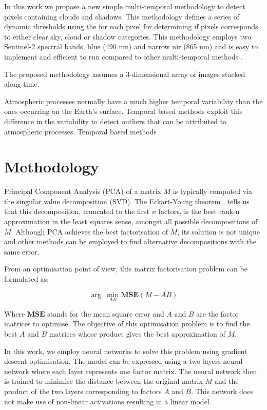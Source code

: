 \documentclass[essd, manuscript]{copernicus}
\begin{document}
In this work we propose a new simple multi-temporal methodology to detect pixels containing clouds and shadows. This methodology defines a series of dynamic thresholds using the for each pixel for determining if pixels corresponds to either clear sky, cloud or shadow categories. This methodology employs two Sentinel-2 spectral bands, blue (490 nm) and narrow nir (865 nm) and is easy to implement and efficient to run compared to other multi-temporal methods \citep{frantz2015enhancing,zhu2018automatic}.

The proposed methodology assumes a 3-dimensional array of images stacked along time. 

Atmospheric processes normally have a much higher temporal variability than the ones occurring on the Earth's surface. Temporal based methods exploit this difference in the variability to detect outliers that can be attributed to atmospheric processes. Temporal based methods  


\section{Methodology}

Principal Component Analysis (PCA) of a matrix $M$ is typically computed via the singular value decomposition (SVD). The Eckart-Young theorem \citep{eckart1936approximation}, tells us that this decomposition, truncated to the first $n$ factors, is the best rank-n approximation in the least squares sense, amongst all possible decompositions of $M$. Although PCA achieves the best factorisation of $M$, its solution is not unique and other methods can be employed to find alternative decompositions with the same error. 

From an optimisation point of view, this matrix factorisation problem can be formulated as:

$$
\arg\:\min_{AB} \mathbf{MSE}(M-AB)
$$

Where $\mathbf{MSE}$ stands for the mean square error and $A$ and $B$ are the factor matrices to optimise. The objective of this optimisation problem is to find the best $A$ and $B$ matrices whose product gives the best approximation of $M$.

In this work, we employ neural networks to solve this problem using gradient descent optimisation. The model can be expressed using a two layers neural network where each layer represents one factor matrix. The neural network then is trained to minimise the distance between the original matrix $M$ and the product of the two layers corresponding to factors $A$ and $B$. This network does not make use of non-linear activations resulting in a linear model.
\end{document}
